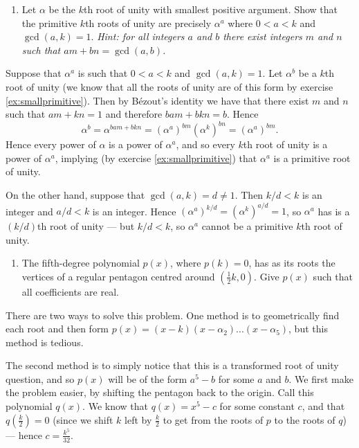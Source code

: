 \documentclass[a4paper,10pt]{article}
\newcommand{\answer}{\bfseries\color{Emerald}\refstepcounter{enumi}\item[\theenumi.]}
\begin{document}
\filbreak\begin{enumerate}[resume]
  \answer Let $ \alpha $ be the $ k$th root of unity with smallest positive argument. Show that the primitive $ k$th roots of unity are
        precisely $ \alpha^a $ where $ 0 < a < k $ and $ \gcd(a, k) = 1 $. \textit{Hint: for all integers
        $ a $ and $ b $ there exist integers $ m $ and $ n $ such that $ am + bn = \gcd(a,b) $.}
\end{enumerate}

Suppose that $ \alpha^a $ is such that $ 0 < a < k $ and $ \gcd(a,k) = 1 $. Let $ \alpha^b $ be a $ k$th root of unity (we know that all the
roots of unity are of this form by exercise \ref{ex:smallprimitive}). Then by B\'ezout's identity we have that there exist $ m $ and $ n $
such that $ am + kn = 1 $ and therefore $ bam + bkn = b $. Hence
\begin{displaymath}
  \alpha^b = \alpha^{bam + bkn} = (\alpha^a)^{bm} (\alpha^k)^{bn} = (\alpha^a)^{bm}.
\end{displaymath}
Hence every power of $ \alpha $ is a power of $ \alpha^a $, and so every $ k$th root of unity is a power of $ \alpha^a $, implying (by
exercise \ref{ex:smallprimitive}) that $ \alpha^a $ is a primitive root of unity.

On the other hand, suppose that $ \gcd(a,k) = d \neq 1 $. Then $ k/d < k $ is an integer and $ a/d < k $ is an integer.
Hence $ (\alpha^a)^{k/d} = (\alpha^k)^{a/d} = 1 $, so $ \alpha^a $ has is a $ (k/d)$th root of unity --- but $ k/d < k $,
so $ \alpha^a $ cannot be a primitive $ k$th root of unity.

\filbreak\begin{enumerate}[resume]
  \answer The fifth-degree polynomial $ p(x) $, where $ p(k) = 0 $, has as its roots
      the vertices of a regular pentagon centred around $ (\frac{1}{2}k, 0) $.
      Give $ p(x) $ such that all coefficients are real.
\end{enumerate}

There are two ways to solve this problem. One method is to geometrically find each
root and then form $ p(x) = (x - k)(x - \alpha_2)...(x - \alpha_5) $,
but this method is tedious.

The second method is to simply notice that this is a transformed root of unity question,
and so $ p(x) $ will be of the form $ a^5 - b $ for some $ a $ and $ b $. We first make
the problem easier, by shifting the pentagon back to the origin. Call this polynomial
$ q(x) $. We know that $ q(x) = x^5 - c $ for some constant $ c $, and that $ q(\frac{k}{2}) = 0 $
(since we shift $ k $ left by $ \frac{k}{2} $ to get from the roots of $ p $ to the roots
of $ q $) --- hence $ c = \frac{k^5}{32} $.
\end{document}
